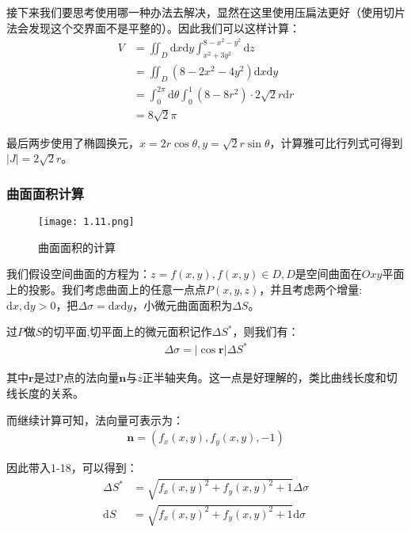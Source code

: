 \documentclass{ctexart}
\begin{document}
接下来我们要思考使用哪一种办法去解决，显然在这里使用压扁法更好（使用切片法会发现这个交界面不是平整的）。因此我们可以这样计算：
 \begin{align*}
V & = \iint_D\mathrm{d}x\mathrm{d}y\int_{x^2+3y^2}^{8-x^2-y^2}\mathrm{d}z\\ 
& = \iint_D(8-2x^2-4y^2)\mathrm{d}x\mathrm{d}y
\\&=\int_0^{2\pi}\mathrm{d}\theta\int_0^1(8-8r^2)\cdot2\sqrt{2}r\mathrm{d}r\\
&=8\sqrt{2}\pi  
\end{align*}

最后两步使用了椭圆换元，$x=2r\cos\theta,y=\sqrt{2}r\sin\theta$，计算雅可比行列式可得到$|J|=2\sqrt{2}r$。

\subsubsection{曲面面积计算}
\begin{figure}[H]    
\centering     
\renewcommand{\figurename}{图}     
\renewcommand{\thefigure}{1.11}    
\begin{myimagebox}[width=0.45\textwidth] %
\texttt{[image: 1.11.png]} %
\end{myimagebox}     
\caption{\label{fig:1.11}曲面面积的计算}   
\end{figure}

我们假设空间曲面的方程为：$z=f(x,y),f(x,y)\in D,D$是空间曲面在$Oxy$平面上的投影。我们考虑曲面上的任意一点点$P(x,y,z)$，并且考虑两个增量:$\mathrm{d}x,\mathrm{d}y>0$，把$\Delta \sigma=\mathrm{d}x\mathrm{d}y$，小微元曲面面积为$\Delta S$。

过$P$做$S$的切平面,切平面上的微元面积记作$\Delta S^*$，则我们有：
\begin{align*}
    \Delta \sigma=|\cos \bm{r}|\Delta S^*\tag{1-18} 
\end{align*}

其中$\bm{r}$是过P点的法向量$\bm{n}$与$z$正半轴夹角。这一点是好理解的，类比曲线长度和切线长度的关系。

而继续计算可知，法向量可表示为：
\begin{align*}
    \bm{n}=(f_x(x,y),f_y(x,y),-1)\tag{1-19}
\end{align*}

因此带入1-18，可以得到：
\begin{align*}
    \Delta S^*&={\sqrt{f_x(x,y)^2+f_y(x,y)^2+1}}\Delta\sigma\\
 \mathrm{d}S&={\sqrt{f_x(x,y)^2+f_y(x,y)^2+1}}\mathrm{d}\sigma
\end{align*}
\end{document}
